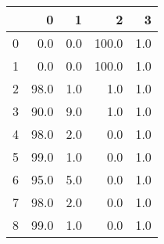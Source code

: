 \begin{tabular}{lrrrr}
\toprule
{} &     0 &    1 &      2 &    3 \\
\midrule
0 &   0.0 &  0.0 &  100.0 &  1.0 \\
1 &   0.0 &  0.0 &  100.0 &  1.0 \\
2 &  98.0 &  1.0 &    1.0 &  1.0 \\
3 &  90.0 &  9.0 &    1.0 &  1.0 \\
4 &  98.0 &  2.0 &    0.0 &  1.0 \\
5 &  99.0 &  1.0 &    0.0 &  1.0 \\
6 &  95.0 &  5.0 &    0.0 &  1.0 \\
7 &  98.0 &  2.0 &    0.0 &  1.0 \\
8 &  99.0 &  1.0 &    0.0 &  1.0 \\
\bottomrule
\end{tabular}
